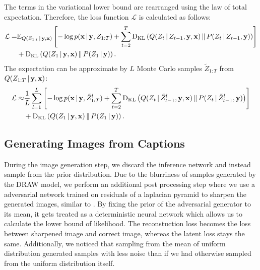 \documentclass{article} %
\newcommand{\comm}[1]{}
\newcommand{\given}{\,|\,}
\newcommand{\expectation}{\mathbb{E}}
\newcommand{\kldiv}{\mathrm{D}_{\rm KL}}
\newcommand{\klBars}{\,\|\,}
\newcommand{\henc}{h^{enc}}
\newcommand{\Lat}{Z}
\newcommand{\numSamples}{L}
\newcommand{\sampleIdx}{l}
\newcommand{\LatSample}{\tilde{Z}}
\newcommand{\icaption}{{\bf{y}}}
\newcommand{\oimage}{{\bf{x}}}
\newcommand{\post}{Q}
\newcommand{\prior}{P}
\newcommand{\loss}{\mathcal{L}}
\begin{document}
The terms in the variational lower bound are rearranged using the law of total expectation. Therefore, the loss function $\loss$ is calculated as follows:
\begin{align}
\loss =  &\expectation_{Q(\Lat_{1:t}\given\icaption,\oimage)}\left[ - \log p(\oimage\given\icaption,\Lat_{1:T}) + \sum_{t=2}^T\kldiv\left(\post(\Lat_t\given\Lat_{t-1},\icaption,\oimage)\klBars\prior(\Lat_t\given\Lat_{t-1},\icaption)\right) \right] \nonumber \\& + \kldiv\left(\post(\Lat_1\given\icaption,\oimage)\klBars\prior(\Lat_1\given\icaption)\right).
\end{align}
The expectation can be approximate by $\numSamples$ Monte Carlo samples $\LatSample_{1:T}$ from $\post(\Lat_{1:T}\given\icaption, \oimage)$:
\begin{align}
\loss \approx  &\frac{1}{\numSamples}\sum_{\sampleIdx=1}^\numSamples\left[ - \log p(\oimage\given\icaption,\LatSample^\sampleIdx_{1:T}) + \sum_{t=2}^T\kldiv\left(\post(\Lat_t\given\LatSample^\sampleIdx_{t-1},\icaption,\oimage)\klBars\prior(\Lat_t\given\LatSample^\sampleIdx_{t-1},\icaption)\right) \right] \nonumber \\& + \kldiv\left(\post(\Lat_1\given\icaption,\oimage)\klBars\prior(\Lat_1\given\icaption)\right).
\end{align}
\comm{
\begin{align}
\loss &= -\sum_{t=1}^{T}D_{KL}(\post(\Lat_t|\henc_t,s_{t-1})\,||\,\prior(\Lat_t)) + \frac{1}{L}\sum_{l=1}^{L}log\,p(x_{t}|y,z)\\
&=
\frac{1}{2}\sum_{t=1}^{T}(1 - 2\,log\,\sigma_{t}^{prior} + 2\,log\,\sigma_{t} - \frac{exp(2\,log\,\sigma_{t}) + (\mu_{t} - \mu_{t}^{prior})^{2}}{exp(2\,log\,\sigma_{t}^{prior})}) + \frac{1}{L}\sum_{l=1}^{L}log\,p(x_{t}|y,z)
\end{align}
}

\subsection{Generating Images from Captions}

During the image generation step, we discard the inference network and instead sample from the prior distribution. 
Due to the blurriness of samples generated by the DRAW model, we perform an additional post processing step where we use a 
adversarial network trained on residuals of a laplacian pyramid 
to sharpen the generated images, similar to \citep{denton_lapgan}. By fixing the prior of the adversarial generator to its mean, it gets treated as a deterministic neural network which allows us to calculate the lower bound of likelihood. The reconstuction loss becomes the loss between sharpened image and correct image, whereas the latent loss stays the same. Additionally, we noticed that sampling from the mean of uniform distribution generated samples with less noise than if we had otherwise sampled from the uniform distribution itself.  
\end{document}
